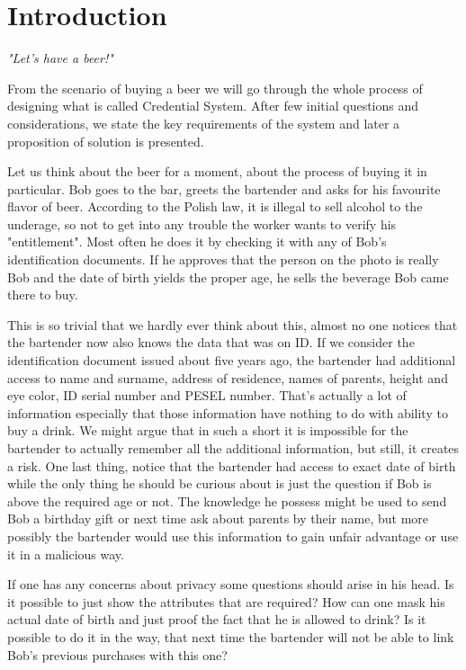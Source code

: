\chapter{Introduction}
\thispagestyle{chapterBeginStyle}

\begin{center}
    \textit{ "Let's have a beer!" }
\end{center}

From the scenario of buying a beer we will go through the whole process of designing what is called Credential System. After few initial questions and considerations, we state the key requirements of the system and later a proposition of solution is presented.

Let us think about the beer for a moment, about the process of buying it in particular. Bob goes to the bar, greets the bartender and asks for his favourite flavor of beer. According to the Polish law, it is illegal to sell alcohol to the underage, so not to get into any trouble the worker wants to verify his "entitlement". Most often he does it by checking it with any of Bob's identification documents. If he approves that the person on the photo is really Bob and the date of birth yields the proper age,  he sells the beverage Bob came there to buy.

This is so trivial that we hardly ever think about this, almost no one notices that the bartender now also knows the 
data that was on ID. If we consider the identification document issued about five years ago, the bartender had additional access to name and surname, address of residence, names of parents, height and eye color, ID serial number and PESEL number. That's actually a lot of information especially that those information have nothing to do with ability to buy a drink. We might argue that in such a short it is impossible for the bartender to actually remember all the additional information, but still, it creates a risk. One last thing, notice that the bartender had access to exact date of birth while the only thing he should be curious about is just the question if Bob is above the required age or not. The knowledge he possess might be used to send Bob a birthday gift or next time ask about parents by their name, but more possibly the bartender would use this information to gain unfair advantage or use it in a malicious way.

If one has any concerns about privacy some questions should arise in his head. Is it possible to just show the attributes that are required? How can one mask his actual date of birth and just proof the fact that he is allowed to drink? Is it possible to do it in the way, that next time the bartender will not be able to link Bob's previous purchases with this one?

